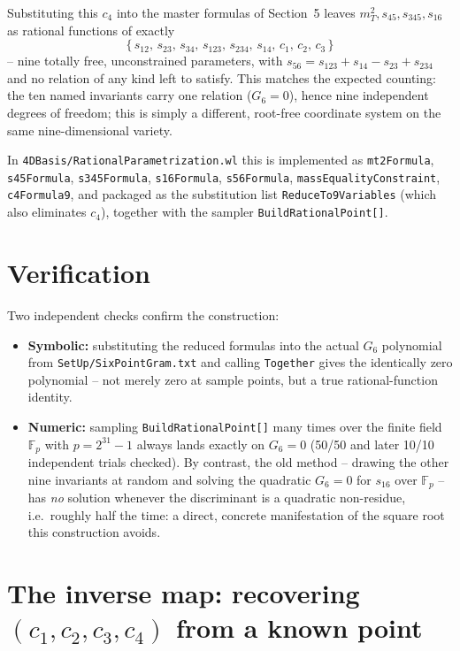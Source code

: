 \documentclass[11pt]{article}
\newcommand{\code}[1]{\texttt{#1}}
\begin{document}
Substituting this $c_4$ into the master formulas of Section~5 leaves $m_T^2,s_{45},s_{345},s_{16}$ as rational functions of exactly
\[
  \boxed{\{\,s_{12},\,s_{23},\,s_{34},\,s_{123},\,s_{234},\,s_{14},\,c_1,\,c_2,\,c_3\,\}}
\]
-- nine totally free, unconstrained parameters, with $s_{56}=s_{123}+s_{14}-s_{23}+s_{234}$ and no relation of any kind left to satisfy. This matches the expected counting: the ten named invariants carry one relation ($G_6=0$), hence nine independent degrees of freedom; this is simply a different, root-free coordinate system on the same nine-dimensional variety.

In \code{4DBasis/RationalParametrization.wl} this is implemented as \code{mt2Formula}, \code{s45Formula}, \code{s345Formula}, \code{s16Formula}, \code{s56Formula}, \code{massEqualityConstraint}, \code{c4Formula9}, and packaged as the substitution list \code{ReduceTo9Variables} (which also eliminates $c_4$), together with the sampler \code{BuildRationalPoint[]}.

\section{Verification}

Two independent checks confirm the construction:
\begin{itemize}
  \item \textbf{Symbolic:} substituting the reduced formulas into the actual $G_6$ polynomial from \code{SetUp/SixPointGram.txt} and calling \code{Together} gives the identically zero polynomial -- not merely zero at sample points, but a true rational-function identity.
  \item \textbf{Numeric:} sampling \code{BuildRationalPoint[]} many times over the finite field $\mathbb{F}_p$ with $p=2^{31}-1$ always lands exactly on $G_6=0$ (50/50 and later 10/10 independent trials checked). By contrast, the old method -- drawing the other nine invariants at random and solving the quadratic $G_6=0$ for $s_{16}$ over $\mathbb{F}_p$ -- has \emph{no} solution whenever the discriminant is a quadratic non-residue, i.e.\ roughly half the time: a direct, concrete manifestation of the square root this construction avoids.
\end{itemize}

\section{The inverse map: recovering $(c_1,c_2,c_3,c_4)$ from a known point}
\end{document}
